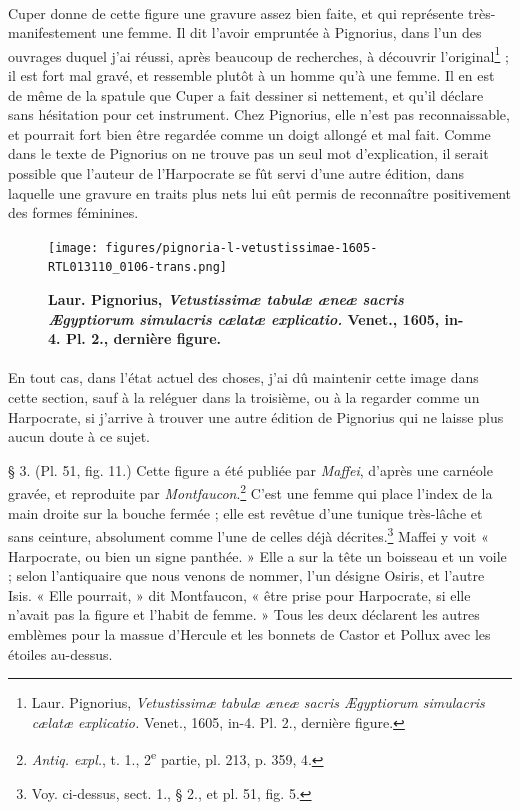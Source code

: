 \documentclass[a4paper, 11pt, oneside, polutonikogreek, french]{article}
\begin{document}
\paragraph{}
Cuper donne de cette figure une gravure assez bien faite, et qui représente très-manifestement une femme. Il dit l'avoir empruntée à Pignorius, dans l'un des ouvrages duquel j'ai réussi, après beaucoup de recherches, à découvrir l'original\footnote{Laur. Pignorius, \emph{Vetustissimæ tabulæ æneæ sacris Ægyptiorum simulacris cælatæ explicatio.} Venet., 1605, in-4. Pl. 2., dernière figure.} ; il est fort mal gravé, et ressemble plutôt à un homme qu'à une femme. Il en est de même de la spatule que Cuper a fait dessiner si nettement, et qu'il déclare sans hésitation pour cet instrument. Chez Pignorius, elle n'est pas reconnaissable, et pourrait fort bien être regardée comme un doigt allongé et mal fait. Comme dans le texte de Pignorius on ne trouve pas un seul mot d'explication, il serait possible que l'auteur de l'Harpocrate se fût servi d'une autre édition, dans laquelle une gravure en traits plus nets lui eût permis de reconnaître positivement des formes féminines.

\begin{figure}[H]
\centering
\texttt{[image: figures/pignoria-l-vetustissimae-1605-RTL013110\_0106-trans.png]}
\caption{\bfseries Laur. Pignorius, \emph{Vetustissimæ tabulæ æneæ sacris Ægyptiorum simulacris cælatæ explicatio.} Venet., 1605, in-4. Pl. 2., dernière figure.}
\end{figure}
\paragraph{}
En tout cas, dans l'état actuel des choses, j'ai dû maintenir cette image dans cette section, sauf à la reléguer dans la troisième, ou à la regarder comme un Harpocrate, si j'arrive à trouver une autre édition de Pignorius qui ne laisse plus aucun doute à ce sujet.

§ 3. (Pl. 51, fig. 11.) Cette figure a été publiée par \emph{Maffei}, d'après une carnéole gravée, et reproduite par \emph{Montfaucon}.\footnote{\emph{Antiq. expl.}, t. 1., 2\textsuperscript{e} partie, pl. 213, p. 359, 4.} C'est une femme qui place l'index de la main droite sur la bouche fermée ; elle est revêtue d'une tunique très-lâche et sans ceinture, absolument comme l'une de celles déjà décrites.\footnote{Voy. ci-dessus, sect. 1., § 2., et pl. 51, fig. 5.} Maffei y voit « Harpocrate, ou bien un signe panthée. » Elle a sur la tête un boisseau et un voile ; selon l'antiquaire que nous venons de nommer, l'un désigne Osiris, et l'autre Isis. « Elle pourrait, » dit Montfaucon, « être prise pour Harpocrate, si elle n'avait pas la figure et l'habit de femme. » Tous les deux déclarent les autres emblèmes pour la massue d'Hercule et les bonnets de Castor et Pollux avec les étoiles au-dessus.
\end{document}
